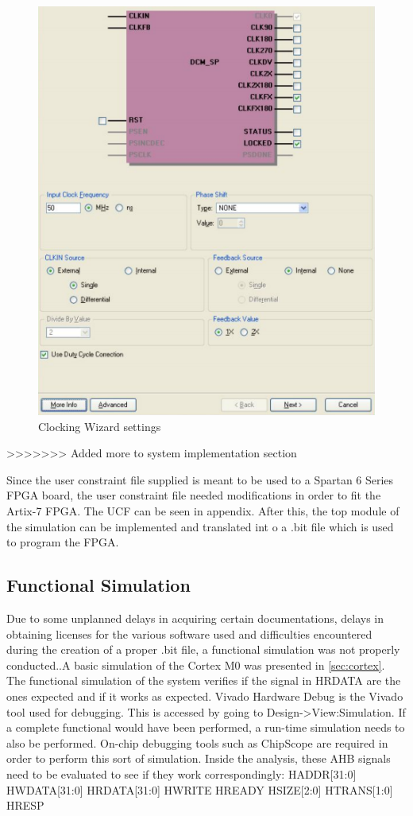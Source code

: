 \begin{figure}
\centering
\includegraphics[scale=0.7]{figures/clock_creation.PNG}
\caption{Clocking Wizard settings } 
\label{fig:clock}
\end{figure}
>>>>>>> Added more to system implementation section

Since the user constraint file supplied is meant to be used to a Spartan 6 Series FPGA board, the user constraint file needed modifications in order to fit the Artix-7 FPGA. The UCF can be seen in appendix. After this, the top module of the simulation can be implemented and translated int o a .bit file which is used to program the FPGA.

\subsection{Functional Simulation}
Due to some unplanned delays in acquiring certain documentations, delays in obtaining licenses for the various software used and difficulties encountered during the creation of a proper .bit file, a functional simulation was not properly conducted..A basic simulation of the Cortex M0 was presented in \ref{sec:cortex}.  The functional simulation of the system verifies if the signal in HRDATA are the ones expected and if it works as expected. Vivado Hardware Debug is the Vivado tool used for debugging. This is accessed by going to Design->View:Simulation. If a complete functional would have been performed, a run-time simulation needs to also be performed. On-chip debugging tools such as ChipScope are required in order to perform this sort of simulation. Inside the analysis, these AHB signals need to be evaluated to see if they work correspondingly: 
HADDR[31:0] 
HWDATA[31:0]
HRDATA[31:0]
HWRITE
HREADY
HSIZE[2:0]
HTRANS[1:0]
HRESP

